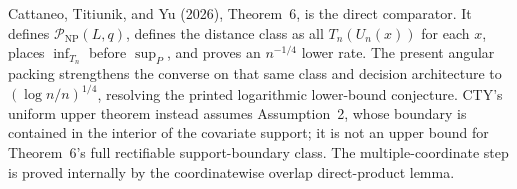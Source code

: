 Cattaneo, Titiunik, and Yu (2026), Theorem~6, is the direct comparator.  It defines \(\mathcal P_{\mathrm{NP}}(L,q)\), defines the distance class as all \(T_n(U_n(x))\) for each \(x\), places \(\inf_{T_n}\) before \(\sup_P\), and proves an \(n^{-1/4}\) lower rate.  The present angular packing strengthens the converse on that same class and decision architecture to \((\log n/n)^{1/4}\), resolving the printed logarithmic lower-bound conjecture.  CTY's uniform upper theorem instead assumes Assumption~2, whose boundary is contained in the interior of the covariate support; it is not an upper bound for Theorem~6's full rectifiable support-boundary class.  The multiple-coordinate step is proved internally by the coordinatewise overlap direct-product lemma.